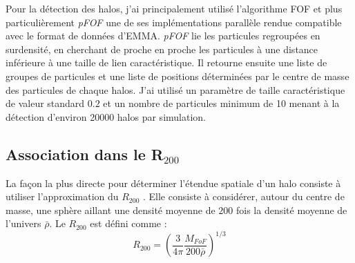 Pour la détection des halos, j'ai principalement utilisé l’algorithme \ac{FOF} et plus particulièrement \textit{pFOF} une de ses implémentations parallèle \citep{2014A&A...564A..13R} rendue compatible avec le format de données d'EMMA.
\textit{pFOF} lie les particules regroupées en surdensité, en cherchant de proche en proche les particules à une distance inférieure à une taille de lien caractéristique.
Il retourne ensuite une liste de groupes de particules et une liste de positions déterminées par le centre de masse des particules de chaque halos.
J'ai utilisé un paramètre de taille caractéristique de valeur standard $0.2$ et un nombre de particules minimum de 10 menant à la détection d'environ 20000 halos par simulation.


\subsection{Association dans le R$_{200}$}

La façon la plus directe pour déterminer l'étendue spatiale d'un halo consiste à utiliser l'approximation du $R_{200}$ \citep{1997ApJ...490..493N}.
Elle consiste à considérer, autour du centre de masse, une sphère aillant une densité moyenne de $200$ fois la densité moyenne de l'univers $\bar{\rho}$.
Le $R_{200}$ est défini comme : 
\begin{equation}
R_{200}= \left( \frac{3}{4\pi} \frac{M_{FoF} }{200 \bar{\rho}}  \right)^{1/3}
\end{equation}




%


